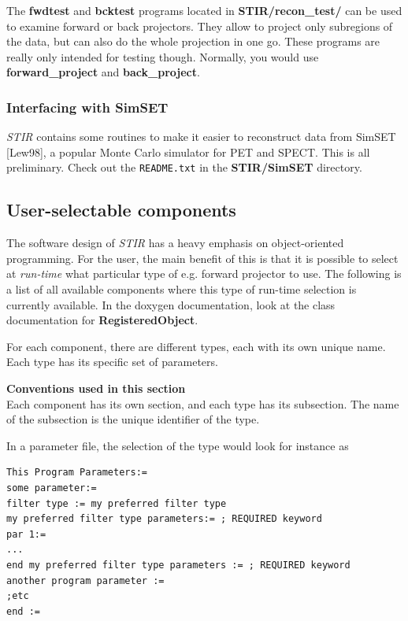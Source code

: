 \documentclass{article}
\begin{document}
{{The \textbf{fwdtest} and \textbf{bcktest} programs located in \textbf{STIR/recon\_test/} can 
be used to examine forward or back projectors. They allow to 
project only subregions of the data, but can also do the whole 
projection in one go. These programs are really only intended for testing though.
Normally, you would use \textbf{forward\_project} and \textbf{back\_project}.


\subsubsection{
Interfacing with SimSET}
\textit{STIR} contains some routines to make it easier to reconstruct data from SimSET [Lew98], 
a popular Monte Carlo simulator for PET and SPECT. This
is all preliminary. Check out the \texttt{README.txt} in the \textbf{STIR/SimSET} directory.


\subsection{
User-selectable components}
\label{sec:user-selectablecomponents}
The software design of \textit{STIR} has a heavy emphasis on object-oriented 
programming. For the user, the main benefit of this is that it 
is possible to select at \textit{run-time} what particular type of 
e.g. forward projector to use. The following is a list of all 
available components where this type of run-time selection is 
currently available. In the doxygen documentation, look at the 
class documentation for \textbf{RegisteredObject}.


For each component, there are different types, each with its 
own unique name. Each type has its specific set of parameters. 

\textbf{Conventions used in this section}\\
Each component has its own section, and each type has its subsection. 
The name of the subsection is the unique identifier of the type.


In a parameter file, the selection of the type would look for 
instance as

\begin{verbatim}
This Program Parameters:=
some parameter:=
filter type := my preferred filter type 
my preferred filter type parameters:= ; REQUIRED keyword 
par 1:= 
... 
end my preferred filter type parameters := ; REQUIRED keyword
another program parameter :=
;etc
end :=
\end{verbatim}


}}
\end{document}
